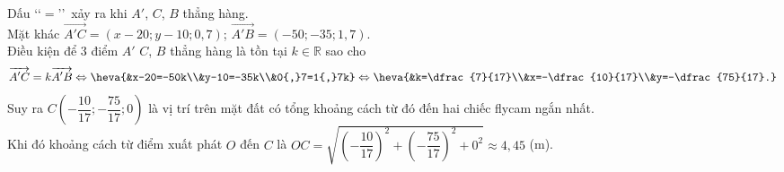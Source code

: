\begin{ex}
{{}
\noindent
Dấu \lq\lq$=$\rq\rq\, xảy ra khi $A'$, $C$, $B$ thẳng hàng.\\
Mặt khác $\overrightarrow{A'C}=(x-20;y-10;0{,}7)$; $\overrightarrow{A'B}=(-50;-35;1{,}7)$.\\
Điều kiện để $3$ điểm $A'$ $C$, $B$ thẳng hàng là tồn tại $k\in \mathbb{R}$ sao cho
$$\overrightarrow{A'C}=k\overrightarrow{A'B}
\Leftrightarrow\heva{&x-20=-50k\\&y-10=-35k\\&0{,}7=1{,}7k}\Leftrightarrow\heva{&k=\dfrac{7}{17}\\&x=-\dfrac{10}{17}\\&y=-\dfrac{75}{17}.}$$
Suy ra $C\left(-\dfrac{10}{17};-\dfrac{75}{17};0\right)$ là vị trí trên mặt đất có tổng khoảng cách từ đó đến hai chiếc flycam ngắn nhất.\\
Khi đó khoảng cách từ điểm xuất phát $O$ đến $C$ là 
$OC=\sqrt{\left(-\dfrac{10}{17}\right)^{2}+\left(-\dfrac{75}{17}\right)^{2}+0^{2}}\approx 4{,}45$ (m). 
	}
\end{ex}

